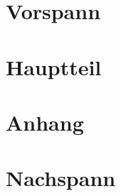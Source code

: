 \documentclass[oneside]{scrbook}
\begin{document}
  \frontmatter
  \chapter{Vorspann}
  \mainmatter
  \chapter{Hauptteil}
  \appendix
  \chapter{Anhang}
  \backmatter
  \chapter{Nachspann}
\end{document}
